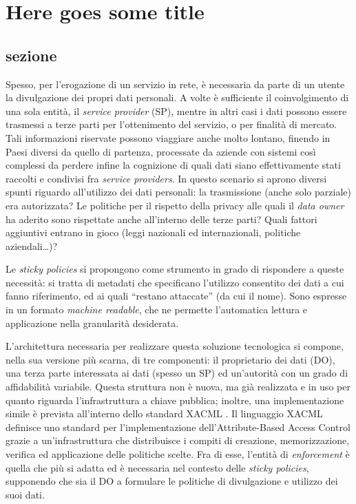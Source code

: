 \chapter{Here goes some title}
\label{capitolo2}
\thispagestyle{empty}

\section{sezione} Spesso, per l’erogazione di un servizio in rete, \`e necessaria da parte di un utente la divulgazione dei propri dati personali. A volte \`e sufficiente il coinvolgimento di una sola entit\`a, il \textit{service provider} (SP), mentre in altri casi i dati possono essere trasmessi a terze parti per l’ottenimento del servizio, o per finalit\`a di mercato. Tali informazioni riservate possono viaggiare anche molto lontano, finendo in Paesi diversi da quello di partenza, processate da aziende con sistemi cos\`i complessi da perdere infine la cognizione di quali dati siano effettivamente stati raccolti e condivisi fra \textit{service providers}.
In questo scenario si aprono diversi spunti riguardo all’utilizzo dei dati personali: la trasmissione (anche solo parziale) era autorizzata? Le politiche per il rispetto della privacy alle quali il \textit{data owner} ha aderito sono rispettate anche all’interno delle terze parti? Quali fattori aggiuntivi entrano in gioco (leggi nazionali ed internazionali, politiche aziendali…)?

Le \textit{sticky policies} si propongono come strumento in grado di rispondere a queste necessità: si tratta di metadati che specificano l’utilizzo consentito dei dati a cui fanno riferimento, ed ai quali “restano attaccate” (da cui il nome). Sono espresse in un formato \textit{machine readable}, che ne permette l’automatica lettura e applicazione nella granularit\`a desiderata. 

L’architettura necessaria per realizzare questa soluzione tecnologica si compone, nella sua versione più scarna, di tre componenti: il proprietario dei dati (DO), una terza parte interessata ai dati (spesso un SP) ed un’autorit\`a con un grado di affidabilit\`a variabile. Questa struttura non è nuova, ma gi\`a realizzata e in uso per quanto riguarda l’infrastruttura a chiave pubblica; inoltre, una implementazione simile \`e prevista all’interno dello standard XACML \cite{standard2005extensible}. Il linguaggio XACML definisce uno standard per l’implementazione dell’Attribute-Based Access Control grazie a un'infrastruttura che distribuisce i compiti di creazione, memorizzazione, verifica ed applicazione delle politiche scelte. Fra di esse, l’entit\`a di \textit{enforcement} \`e quella che pi\`u si adatta ed \`e necessaria nel contesto delle \textit{sticky policies}, supponendo che sia il DO a formulare le politiche di divulgazione e utilizzo dei suoi dati. 

